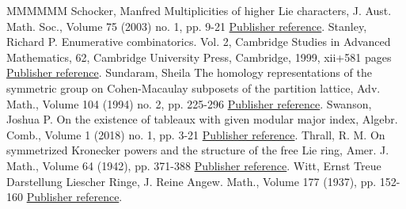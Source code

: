 \documentclass[11pt]{article}
\theoremstyle{definition}
\numberwithin{equation}{section}
\begin{document}
\begin{thebibliography}{MMMMMM}
 Schocker, Manfred Multiplicities of higher Lie characters, J. Aust. Math. Soc., Volume 75 (2003) no. 1, pp. 9-21 \href{https://alco.centre-mersenne.org/articles/10.5802/alco.421/#Sch}{Publisher reference}.
 Stanley, Richard P. Enumerative combinatorics. Vol. 2, Cambridge Studies in Advanced Mathematics, 62, Cambridge University Press, Cambridge, 1999, xii+581 pages \href{https://alco.centre-mersenne.org/articles/10.5802/alco.421/#Stan}{Publisher reference}.
 Sundaram, Sheila The homology representations of the symmetric group on Cohen-Macaulay subposets of the partition lattice, Adv. Math., Volume 104 (1994) no. 2, pp. 225-296 \href{https://alco.centre-mersenne.org/articles/10.5802/alco.421/#Sun}{Publisher reference}.
 Swanson, Joshua P. On the existence of tableaux with given modular major index, Algebr. Comb., Volume 1 (2018) no. 1, pp. 3-21 \href{https://alco.centre-mersenne.org/articles/10.5802/alco.421/#Swa}{Publisher reference}.
 Thrall, R. M. On symmetrized Kronecker powers and the structure of the free Lie ring, Amer. J. Math., Volume 64 (1942), pp. 371-388 \href{https://alco.centre-mersenne.org/articles/10.5802/alco.421/#Thrall}{Publisher reference}.
 Witt, Ernst Treue Darstellung Liescher Ringe, J. Reine Angew. Math., Volume 177 (1937), pp. 152-160 \href{https://alco.centre-mersenne.org/articles/10.5802/alco.421/#Witt}{Publisher reference}.
\end{thebibliography}
\end{document}
